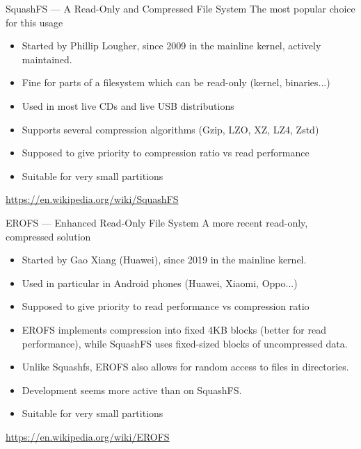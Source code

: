 \begin{frame}{SquashFS --- A Read-Only and Compressed File System}
    The most popular choice for this usage
    \begin{itemize}
        \item Started by Phillip Lougher, since 2009 in the mainline kernel, actively maintained.
        \item Fine for parts of a filesystem which can be read-only (kernel, binaries...)
        \item Used in most live CDs and live USB distributions
        \item Supports several compression algorithms (Gzip, LZO, XZ, LZ4, Zstd)
        \item Supposed to give priority to compression ratio vs read performance
        \item Suitable for very small partitions
    \end{itemize}
    \url{https://en.wikipedia.org/wiki/SquashFS}
\end{frame}

\begin{frame}{EROFS --- Enhanced Read-Only File System}
    A more recent read-only, compressed solution
    \begin{itemize}
        \item Started by Gao Xiang (Huawei), since 2019 in the mainline kernel.
        \item Used in particular in Android phones (Huawei, Xiaomi, Oppo...)
        \item Supposed to give priority to read performance vs compression ratio
        \item EROFS implements compression into fixed 4KB blocks (better for read
              performance), while SquashFS uses fixed-sized blocks of uncompressed
              data.
        \item Unlike Squashfs, EROFS also allows for random access to files in
              directories.
        \item Development seems more active than on SquashFS.
        \item Suitable for very small partitions
    \end{itemize}
    \url{https://en.wikipedia.org/wiki/EROFS}
\end{frame}


